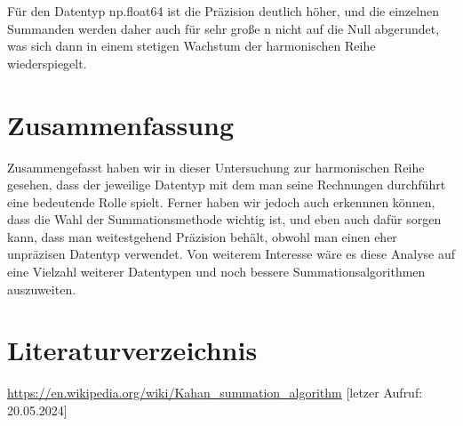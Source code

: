 \documentclass{scrreprt}
\begin{document}
Für den Datentyp np.float64 ist die Präzision deutlich höher, und die einzelnen Summanden werden daher auch für sehr große n nicht auf die Null abgerundet, 
was sich dann in einem stetigen Wachstum der harmonischen Reihe wiederspiegelt.

\chapter{Zusammenfassung}
Zusammengefasst haben wir in dieser Untersuchung zur harmonischen Reihe gesehen, dass der jeweilige Datentyp mit dem man seine Rechnungen durchführt eine bedeutende Rolle spielt. 
Ferner haben wir jedoch auch erkennnen können, dass die Wahl der Summationsmethode wichtig ist, und eben auch dafür sorgen kann, 
dass man weitestgehend Präzision behält, obwohl man einen eher unpräzisen Datentyp verwendet.
Von weiterem Interesse wäre es diese Analyse auf eine Vielzahl weiterer Datentypen und noch bessere Summationsalgorithmen auszuweiten.


\chapter{Literaturverzeichnis}
\url{https://en.wikipedia.org/wiki/Kahan_summation_algorithm} [letzer Aufruf: 20.05.2024]
\end{document}
